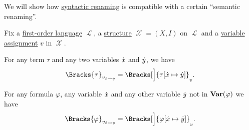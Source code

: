 \begin{proposition}\label{thm:renaming_assignment_compatibility}
  We will show how \hyperref[rem:first_order_substitution_renaming_justification]{syntactic renaming} is compatible with a certain \enquote{semantic renaming}.

  Fix a \hyperref[def:first_order_language]{first-order language} \( \mscrL \), a \hyperref[def:first_order_structure]{structure} \( \mscrX = (X, I) \) on \( \mscrL \) and a \hyperref[def:first_order_valuation/variable_assignment]{variable assignment} \( v \) in \( \mscrX \).

  \begin{thmenum}
     For any term \( \tau \) and any two variables \( {\dot{x}} \) and \( {\dot{y}} \), we have
    \begin{equation}\label{eq:thm:renaming_assignment_compatibility/terms}
      \Bracks{\tau}_{v_{\synx \mapsto \syny}}
      =
      \Bracks[\Big]{\tau[\synx \mapsto \syny]}_v.
    \end{equation}

     For any formula \( \varphi \), any variable \( {\dot{x}} \) and any other variable \( {\dot{y}} \) not in \( \op*{Var}(\varphi) \) we have
    \begin{equation}\label{eq:thm:renaming_assignment_compatibility/formulas}
      \Bracks{\varphi}_{v_{\synx \mapsto \syny}}
      =
      \Bracks[\Big]{\varphi[\synx \mapsto \syny]}_v.
    \end{equation}
  \end{thmenum}
\end{proposition}
